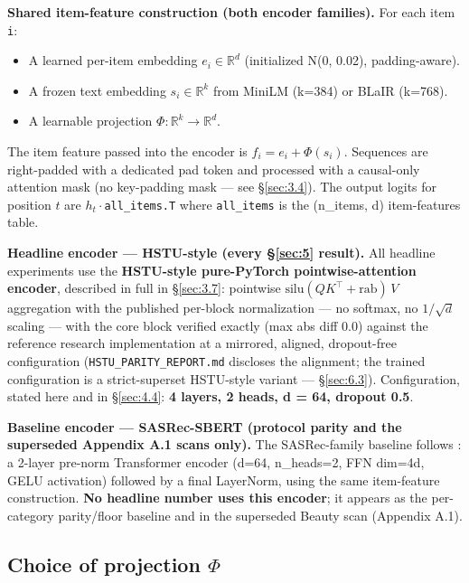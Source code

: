 \textbf{Shared item-feature construction (both encoder families).} For each item \texttt{i}:

\begin{itemize}
\tightlist
\item
  A learned per-item embedding $e_i \in \mathbb{R}^d$ (initialized N(0, 0.02), padding-aware).
\item
  A frozen text embedding $s_i \in \mathbb{R}^k$ from MiniLM (k=384) or BLaIR (k=768).
\item
  A learnable projection $\Phi : \mathbb{R}^k \rightarrow \mathbb{R}^d$.
\end{itemize}

The item feature passed into the encoder is $f_i = e_i + \Phi(s_i)$. Sequences are right-padded with a dedicated pad token and processed with a causal-only attention mask (no key-padding mask --- see \S\ref{sec:3.4}). The output logits for position $t$ are $h_t \cdot{}$\texttt{all\_items.T} where \texttt{all\_items} is the (n\_items, d) item-features table.

\textbf{Headline encoder --- HSTU-style (every \S\ref{sec:5} result).} All headline experiments use the \textbf{HSTU-style pure-PyTorch pointwise-attention encoder}, described in full in \S\ref{sec:3.7}: pointwise $\mathrm{silu}(QK^{\top} + \mathrm{rab})\,V$ aggregation with the published per-block normalization --- no softmax, no $1/\sqrt{d}$ scaling --- with the core block verified exactly (max abs diff 0.0) against the reference research implementation at a mirrored, aligned, dropout-free configuration (\texttt{HSTU\_PARITY\_REPORT.md} discloses the alignment; the trained configuration is a strict-superset HSTU-style variant --- \S\ref{sec:6.3}). Configuration, stated here and in \S\ref{sec:4.4}: \textbf{4 layers, 2 heads, d = 64, dropout 0.5}.

\textbf{Baseline encoder --- SASRec-SBERT (protocol parity and the superseded Appendix A.1 scans only).} The SASRec-family baseline follows \citet{kang2018sasrec}: a 2-layer pre-norm Transformer encoder (d=64, n\_heads=2, FFN dim=4d, GELU activation) followed by a final LayerNorm, using the same item-feature construction. \textbf{No headline number uses this encoder}; it appears as the per-category parity/floor baseline and in the superseded Beauty scan (Appendix A.1).


\subsection{Choice of projection \texorpdfstring{\ensuremath{\Phi}}{Phi}}\label{sec:3.3}

